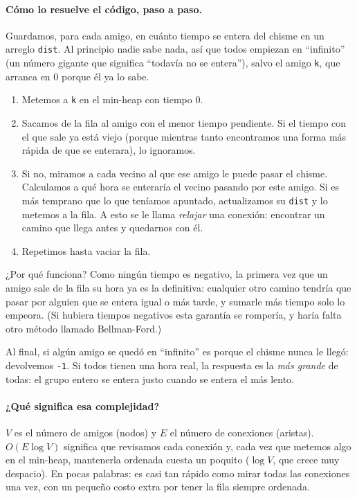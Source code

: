 \paragraph{Cómo lo resuelve el código, paso a paso.} Guardamos, para cada
amigo, en cuánto tiempo se entera del chisme en un arreglo \texttt{dist}. Al
principio nadie sabe nada, así que todos empiezan en ``infinito'' (un número
gigante que significa ``todavía no se entera''), salvo el amigo \texttt{k},
que arranca en $0$ porque él ya lo sabe.
\begin{enumerate}
  \item Metemos a \texttt{k} en el min-heap con tiempo $0$.
  \item Sacamos de la fila al amigo con el menor tiempo pendiente. Si el
        tiempo con el que sale ya está viejo (porque mientras tanto
        encontramos una forma más rápida de que se enterara), lo ignoramos.
  \item Si no, miramos a cada vecino al que ese amigo le puede pasar el
        chisme. Calculamos a qué hora se enteraría el vecino pasando por
        este amigo. Si es más temprano que lo que teníamos apuntado,
        actualizamos su \texttt{dist} y lo metemos a la fila. A esto se le
        llama \emph{relajar} una conexión: encontrar un camino que llega
        antes y quedarnos con él.
  \item Repetimos hasta vaciar la fila.
\end{enumerate}
¿Por qué funciona? Como ningún tiempo es negativo, la primera vez que un
amigo sale de la fila su hora ya es la definitiva: cualquier otro camino
tendría que pasar por alguien que se entera igual o más tarde, y sumarle más
tiempo solo lo empeora. (Si hubiera tiempos negativos esta garantía se
rompería, y haría falta otro método llamado Bellman-Ford.)

Al final, si algún amigo se quedó en ``infinito'' es porque el chisme nunca
le llegó: devolvemos \texttt{-1}. Si todos tienen una hora real, la respuesta
es la \emph{más grande} de todas: el grupo entero se entera justo cuando se
entera el más lento.




\paragraph{¿Qué significa esa complejidad?} $V$ es el número de amigos
(nodos) y $E$ el número de conexiones (aristas). $O(E \log V)$ significa que
revisamos cada conexión y, cada vez que metemos algo en el min-heap,
mantenerla ordenada cuesta un poquito ($\log V$, que crece muy despacio). En
pocas palabras: es casi tan rápido como mirar todas las conexiones una vez,
con un pequeño costo extra por tener la fila siempre ordenada.

